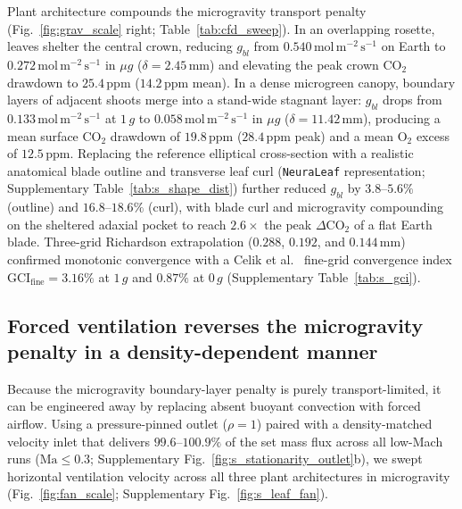 \documentclass[preprint,11pt,numbers,sort&compress]{elsarticle}
\newcommand{\molms}{\ensuremath{\mathrm{mol\,m^{-2}\,s^{-1}}}}
\begin{document}
Plant architecture compounds the microgravity transport penalty (Fig.~\ref{fig:grav_scale} right; Table~\ref{tab:cfd_sweep}). In an overlapping rosette, leaves shelter the central crown, reducing $g_{bl}$ from $0.540\,\molms$ on Earth to $0.272\,\molms$ in $\mu g$ ($\delta = 2.45\,\mathrm{mm}$) and elevating the peak crown $\mathrm{CO_2}$ drawdown to $25.4\,\mathrm{ppm}$ ($14.2\,\mathrm{ppm}$ mean). In a dense microgreen canopy, boundary layers of adjacent shoots merge into a stand-wide stagnant layer: $g_{bl}$ drops from $0.133\,\molms$ at $1\,g$ to $0.058\,\molms$ in $\mu g$ ($\delta = 11.42\,\mathrm{mm}$), producing a mean surface $\mathrm{CO_2}$ drawdown of $19.8\,\mathrm{ppm}$ ($28.4\,\mathrm{ppm}$ peak) and a mean $\mathrm{O_2}$ excess of $12.5\,\mathrm{ppm}$. Replacing the reference elliptical cross-section with a realistic anatomical blade outline and transverse leaf curl (\texttt{NeuraLeaf} representation; Supplementary Table~\ref{tab:s_shape_dist}) further reduced $g_{bl}$ by $3.8\text{--}5.6\%$ (outline) and $16.8\text{--}18.6\%$ (curl), with blade curl and microgravity compounding on the sheltered adaxial pocket to reach $2.6\times$ the peak $\Delta\mathrm{CO_2}$ of a flat Earth blade. Three-grid Richardson extrapolation ($0.288$, $0.192$, and $0.144\,\mathrm{mm}$) confirmed monotonic convergence with a Celik et al.~\citep{celik2008} fine-grid convergence index $\mathrm{GCI}_{\text{fine}} = 3.16\%$ at $1\,g$ and $0.87\%$ at $0\,g$ (Supplementary Table~\ref{tab:s_gci}).

\subsection{Forced ventilation reverses the microgravity penalty in a density-dependent manner}\label{sec:ventilation}

Because the microgravity boundary-layer penalty is purely transport-limited, it can be engineered away by replacing absent buoyant convection with forced airflow. Using a pressure-pinned outlet ($\rho = 1$) paired with a density-matched velocity inlet that delivers $99.6\text{--}100.9\%$ of the set mass flux across all low-Mach runs ($\mathrm{Ma}\le 0.3$; Supplementary Fig.~\ref{fig:s_stationarity_outlet}b), we swept horizontal ventilation velocity across all three plant architectures in microgravity (Fig.~\ref{fig:fan_scale}; Supplementary Fig.~\ref{fig:s_leaf_fan}).
\end{document}
